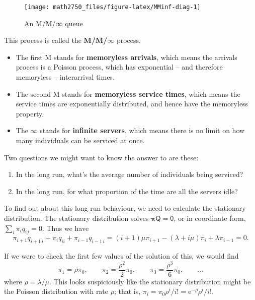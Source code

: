 \documentclass[
  a4paper,
]{article}
\providecommand{\tightlist}{%
  \setlength{\itemsep}{0pt}\setlength{\parskip}{0pt}}
\theoremstyle{definition}
\theoremstyle{definition}
\theoremstyle{definition}
\theoremstyle{remark}
\begin{document}
\begin{figure}

{\centering \texttt{[image: math2750\_files/figure-latex/MMinf-diag-1]} 

}

\caption{An M/M/∞ queue}\label{fig:MMinf-diag}
\end{figure}

This process is called the \textbf{M/M/\(\infty\)} process.

\begin{itemize}
\tightlist
\item
  The first M stands for \textbf{memoryless arrivals}, which means the arrivals process is a Poisson process, which has exponential -- and therefore memoryless -- interarrival times.
\item
  The second M stands for \textbf{memoryless service times}, which means the service times are exponentially distributed, and hence have the memoryless property.
\item
  The \(\infty\) stands for \textbf{infinite servers}, which means there is no limit on how many individuals can be serviced at once.
\end{itemize}

Two questions we might want to know the answer to are these:

\begin{enumerate}
\def\labelenumi{\arabic{enumi}.}
\tightlist
\item
  In the long run, what's the average number of individuals being serviced?
\item
  In the long run, for what proportion of the time are all the servers idle?
\end{enumerate}

To find out about this long run behaviour, we need to calculate the stationary distribution. The stationary distribution solves \(\boldsymbol\pi\mathsf Q = \mathsf 0\), or in coordinate form, \(\sum_i \pi_i q_{ij} = 0\). Thus we have
\[
    \pi_{i+1} q_{i+1\,i} + \pi_i q_{ii} + \pi_{i-1} q_{i-1\,i} = (i+1)\mu \pi_{i+1} - (\lambda + i\mu)\pi_i + \lambda \pi_{i-1} = 0 .
\]

If we were to check the first few values of the solution of this, we would find
\[ \pi_1 = \rho \pi_0, \qquad \pi_2 = \frac{\rho^2}{2} \pi_0, \qquad \pi_3 = \frac{\rho^3}{6} \pi_0 , \qquad \dots\]
where \(\rho = \lambda/\mu\). This looks suspiciously like the stationary distribution might be the Poisson distribution with rate \(\rho\); that is, \(\pi_i = \pi_0 \rho^i / i! = \mathrm{e}^{-\rho} \rho^i / i!\).
\end{document}
